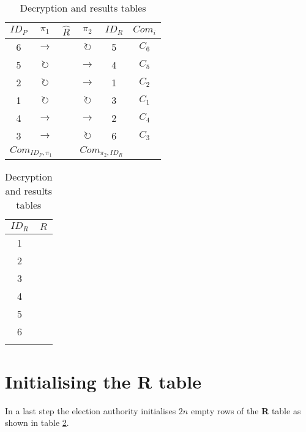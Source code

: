 \begin{table}[h]
	\begin{subtable}{.6\linewidth}
		\centering
		\begin{tabular}{|c|c|c|c|c|c|}
			\hline
			$ID_P$ & $\pi_1$ & $\hat{R}$ & $\pi_2$ & $ID_R$ & $Com_{i}$ \\
			\hline
			6 & $\rightarrow$       & & $\circlearrowright$ & 5 & $C_6$ \\
			5 & $\circlearrowright$ & & $\rightarrow$       & 4 & $C_5$ \\
			2 & $\circlearrowright$ & & $\rightarrow$       & 1 & $C_2$ \\
			1 & $\circlearrowright$ & & $\circlearrowright$ & 3 & $C_1$ \\
			4 & $\rightarrow$       & & $\rightarrow$       & 2 & $C_4$ \\
			3 & $\rightarrow$       & & $\circlearrowright$ & 6 & $C_3$ \\
			\hline
			\multicolumn{2}{|c|}{$Com_{ID_P, \pi_1}$} &   & \multicolumn{2}{c|}{$Com_{\pi_2, ID_R}$} & \\
			\hline
		\end{tabular}
		\caption{Decryption table}
		\label{tbl:d_table_full}
	\end{subtable}%
	\begin{subtable}{.4\linewidth}
		\centering
		\begin{tabular}{|c|c|}
			\hline
			$ID_R$ & $R$ \\
			\hline
			1 & \\
			2 & \\
			3 & \\
			4 & \\
			5 & \\
			6 & \\
			\hline
			\multicolumn{2}{l}{} %
		\end{tabular}
		\caption{Results table}
		\label{tbl:r_table_full}
	\end{subtable}
	\caption{Decryption and results tables}
\end{table}

\section{Initialising the \textbf{R} table}

In a last step the election authority initialises $2n$ empty rows of the
\textbf{R} table as shown in table \ref{tbl:r_table_full}.

